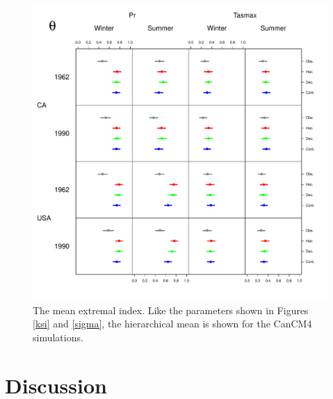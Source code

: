 \documentclass[12pt]{article}
\begin{document}
\begin{figure}
\begin{center}
\includegraphics[scale=0.72]{figs/theta.pdf}
\end{center}
\caption{The mean extremal index. Like the parameters shown in Figures \ref{ksi} and \ref{sigma}, the hierarchical mean is shown for the CanCM4 simulations.}
\label{theta}
\end{figure}

\section{Discussion}
\label{discussion}






\end{document}
